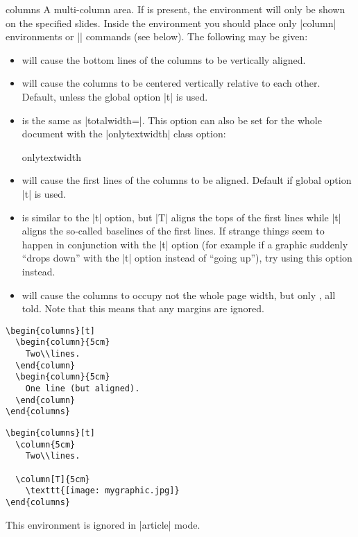 \begin{environment}{{columns}}
  A multi-column area. If  is present, the environment will only be shown on the specified slides. Inside the environment you should place only |column| environments or |\column| commands (see below). The following  may be given:
  \begin{itemize}
  \item
     will cause the bottom lines of the columns to be vertically aligned.
  \item
     will cause the columns to be centered vertically relative to each other. Default, unless the global option |t| is used.
  \item
     is the same as |totalwidth=\textwidth|. This option can also be set for the whole document with the |onlytextwidth| class option:
    \begin{classoption}{onlytextwidth}
    \end{classoption}
  \item
     will cause the first lines of the columns to be aligned. Default if global option |t| is used.
  \item
     is similar to the |t| option, but |T| aligns the tops of the first lines while |t| aligns the so-called baselines of the first lines. If strange things seem to happen in conjunction with the |t| option (for example if a graphic suddenly ``drops down'' with the |t| option instead of ``going up''), try using this option instead.
  \item
     will cause the columns to occupy not the whole page width, but only , all told.
     Note that this means that any margins are ignored.
  \end{itemize}

  \example
\begin{verbatim}
\begin{columns}[t]
  \begin{column}{5cm}
    Two\\lines.
  \end{column}
  \begin{column}{5cm}
    One line (but aligned).
  \end{column}
\end{columns}
\end{verbatim}

  \example
\begin{verbatim}
\begin{columns}[t]
  \column{5cm}
    Two\\lines.

  \column[T]{5cm}
    \texttt{[image: mygraphic.jpg]}
\end{columns}
\end{verbatim}

  \articlenote
  This environment is ignored in |article| mode.

\end{environment}

